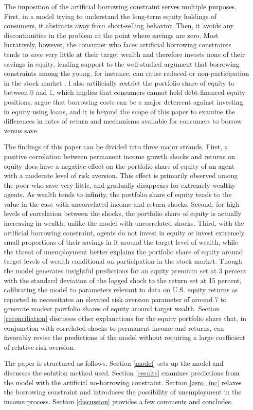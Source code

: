 The imposition of the artificial borrowing constraint serves multiple purposes. First, in a model trying to understand the long-term equity holdings of consumers, it abstracts away from short-selling behavior. Then, it avoids any discontinuities in the problem at the point where savings are zero. Most lucratively, however, the consumer who faces artificial borrowing constraints tends to save very little at their target wealth and therefore invests none of their savings in equity, lending support to the well-studied argument that borrowing constraints among the young, for instance, can cause reduced or non-participation in the stock market \citep{Constantinides2002, Haliassos1998, Kogan2007, Harenberg2018}. I also artificially restrict the portfolio share of equity to between 0 and 1, which implies that consumers cannot hold debt-financed equity positions. \citet{Davis2006} argue that borrowing costs can be a major deterrent against investing in equity using loans, and it is beyond the scope of this paper to examine the differences in rates of return and mechanisms available for consumers to borrow versus save.

The findings of this paper can be divided into three major strands. First, a positive correlation between permanent income growth shocks and returns on equity does have a negative effect on the portfolio share of equity of an agent with a moderate level of risk aversion. This effect is primarily observed among the poor who save very little, and gradually disappears for extremely wealthy agents. As wealth tends to infinity, the portfolio share of equity tends to the value in the case with uncorrelated income and return shocks. Second, for high levels of correlation between the shocks, the portfolio share of equity is actually increasing in wealth, unlike the model with uncorrelated shocks. Third, with the artificial borrowing constraint, agents do not invest in equity or invest extremely small proportions of their savings in it around the target level of wealth, while the threat of unemployment better explains the portfolio share of equity around target levels of wealth conditional on participation in the stock market. Though the model generates insightful predictions for an equity premium set at 3 percent with the standard deviation of the logged shock to the return set at 15 percent, calibrating the model to parameters relevant to data on U.S. equity returns as reported in \citet{Mehra2006} necessitates an elevated risk aversion parameter of around 7 to generate modest portfolio shares of equity around target wealth. Section \ref{reconciliation} discusses other explanations for the equity portfolio share that, in conjunction with correlated shocks to permanent income and returns, can favorably revise the predictions of the model without requiring a large coefficient of relative risk aversion.

The paper is structured as follows. Section \ref{model} sets up the model and discusses the solution method used. Section \ref{results} examines predictions from the model with the artificial no-borrowing constraint. Section \ref{zero_inc} relaxes the borrowing constraint and introduces the possibility of unemployment in the income process. Section \ref{discussion} provides a few comments and concludes.